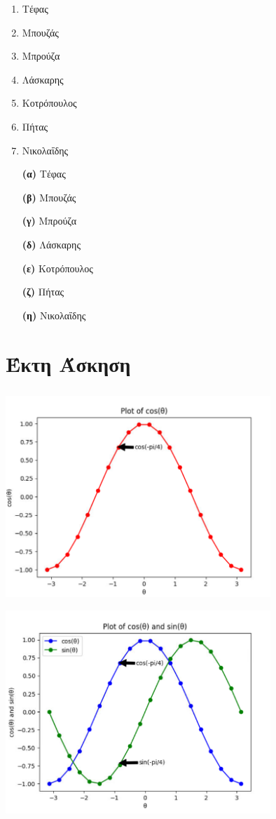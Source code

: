 \documentclass{article}
\begin{document}
\begin{enumerate}
  \item Τέφας
  \item Μπουζάς
  \item Μπρούζα
  \item Λάσκαρης
  \item Κοτρόπουλος
  \item Πήτας
  \item Νικολαΐδης
\end{enumerate}

\begin{itemize}
\item[\textbf{(α)}] Τέφας
\item[\textbf{(β)}] Μπουζάς
\item[\textbf{(γ)}] Μπρούζα
\item[\textbf{(δ)}] Λάσκαρης
\item[\textbf{(ε)}] Κοτρόπουλος
\item[\textbf{(ζ)}] Πήτας
\item[\textbf{(η)}] Νικολαΐδης
\end{itemize}

\section{Έκτη Άσκηση}
\begin{center}
\includegraphics[width=10cm, height=8cm]{cos graph.png} \\
\includegraphics[width=10cm, height=8cm]{cos and sin graph.png}
\end{center}
\end{document}
